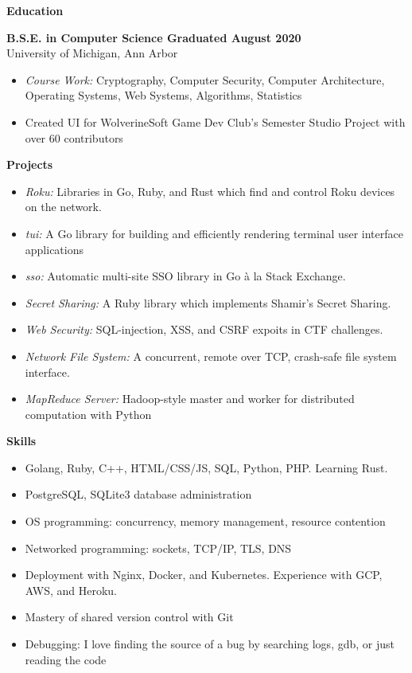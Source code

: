 \documentclass[10pt]{article}
\begin{document}
{\LARGE\textbf{Education}}
\vspace{0.15in}

\textbf{B.S.E. in Computer Science \hfill  Graduated August 2020} \\
University of Michigan, Ann Arbor

\begin{itemize}[leftmargin=1em]
  \setlength\itemsep{-0.3em}
  \item \textit{Course Work: } Cryptography, Computer Security, Computer Architecture, Operating Systems, Web Systems, Algorithms, Statistics
  \item Created UI for WolverineSoft Game Dev Club's Semester Studio Project with over 60 contributors
\end{itemize}
\vspace{0.15in}

{\LARGE\textbf{Projects}}
\begin{itemize}[leftmargin=1em]
  \setlength\itemsep{-0.3em}
  \item \textit{Roku:} Libraries in Go, Ruby, and Rust which find and control Roku devices on the network.
  \item \textit{tui:} A Go library for building and efficiently rendering terminal user interface applications
  \item \textit{sso:} Automatic multi-site SSO library in Go \`{a} la Stack Exchange.
  \item \textit{Secret Sharing:} A Ruby library which implements Shamir's Secret Sharing.
  \item \textit{Web Security:} SQL-injection, XSS, and CSRF expoits in CTF challenges.
  \item \textit{Network File System:} A concurrent, remote over TCP, crash-safe file system interface.
  \item \textit{MapReduce Server:} Hadoop-style master and worker for distributed computation with Python
\end{itemize}
\vspace{0.25in}

{\LARGE\textbf{Skills}}
\begin{itemize}[leftmargin=1em]
  \setlength\itemsep{-0.3em}
  \item{Golang, Ruby, C++, HTML/CSS/JS, SQL, Python, PHP. Learning Rust.}
  \item{PostgreSQL, SQLite3 database administration}
  \item{OS programming: concurrency, memory management, resource contention}
  \item{Networked programming: sockets, TCP/IP, TLS, DNS}
  \item{Deployment with Nginx, Docker, and Kubernetes. Experience with GCP, AWS, and Heroku.}
  \item{Mastery of shared version control with Git}
  \item{Debugging: I love finding the source of a bug by searching logs, gdb, or just reading the code}
\end{itemize}
\end{document}
